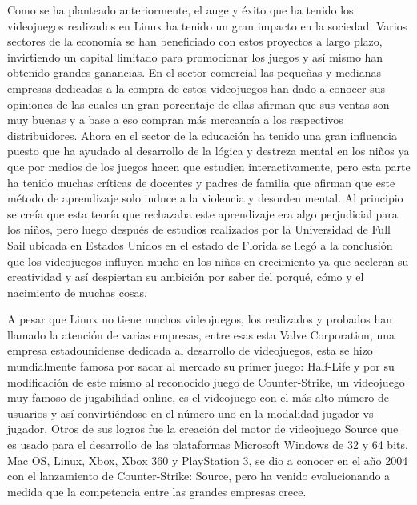 Como se ha planteado anteriormente, el auge y éxito que ha
tenido los videojuegos realizados en Linux ha tenido un gran
impacto en la sociedad. Varios sectores de la economía se han
beneficiado con estos proyectos a largo plazo, invirtiendo un
capital limitado para promocionar los juegos y así mismo han
obtenido grandes ganancias. En el sector comercial las
pequeñas y medianas empresas dedicadas a la compra de estos
videojuegos han dado a conocer sus opiniones de las cuales un
gran porcentaje de ellas afirman que sus ventas son muy buenas
y a base a eso compran más mercancía a los respectivos
distribuidores. Ahora en el sector de la educación ha tenido una
gran influencia puesto que ha ayudado al desarrollo de la lógica
y destreza mental en los niños ya que por medios de los juegos
hacen que estudien interactivamente, pero esta parte ha tenido
muchas críticas de docentes y padres de familia que afirman que
este método de aprendizaje solo induce a la violencia y desorden
mental. Al principio se creía que esta teoría que rechazaba este
aprendizaje era algo perjudicial para los niños, pero luego
después de estudios realizados por la Universidad de Full Sail
ubicada en Estados Unidos en el estado de Florida se llegó a la
conclusión que los videojuegos influyen mucho en los niños en
crecimiento ya que aceleran su creatividad y así despiertan su
ambición por saber del porqué, cómo y el nacimiento de muchas
cosas.

A pesar que Linux no tiene muchos videojuegos, los realizados y
probados han llamado la atención de varias empresas, entre
esas esta Valve Corporation, una empresa estadounidense
dedicada al desarrollo de videojuegos, esta se hizo
mundialmente famosa por sacar al mercado su primer juego:
Half-Life y por su modificación de este mismo al reconocido
juego de Counter-Strike, un videojuego muy famoso de
jugabilidad online, es el videojuego con el más alto número de
usuarios y así convirtiéndose en el número uno en la modalidad
jugador vs jugador. Otros de sus logros fue la creación del motor
de videojuego Source que es usado para el desarrollo de las
plataformas Microsoft Windows de 32 y 64 bits, Mac OS, Linux,
Xbox, Xbox 360 y PlayStation 3, se dio a conocer en el año 2004
con el lanzamiento de Counter-Strike: Source, pero ha venido
evolucionando a medida que la competencia entre las grandes
empresas crece.


